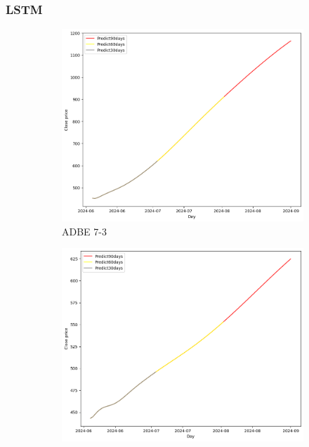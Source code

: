 \documentclass{ieeeojies}
\begin{document}
\subsubsection {LSTM}
\begin{figure}[H]
    \centering
    \begin{subfigure}[b]{0.33\linewidth}
        \centering
        \includegraphics[width=\linewidth]{LSTM Plot/ADBE_LSTM_7_3-90.png}
        \caption{ADBE 7-3}
        \label{fig:adbe-7-3}
    \end{subfigure}%
    \hfill
    \begin{subfigure}[b]{0.33\linewidth}
        \centering
        \includegraphics[width=\linewidth]{LSTM Plot/ADBE_LSTM_8_2-90.png}

\end{subfigure}
\end{figure}
\end{document}
